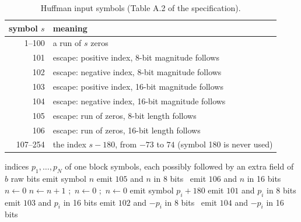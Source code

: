 \begin{table}[ht]
  \centering\small
  \begin{tabular}{@{}rl@{}}
    \toprule
    symbol $s$ & meaning\\
    \midrule
    1--100 & a run of $s$ zeros\\
    101 & escape: positive index, 8-bit magnitude follows\\
    102 & escape: negative index, 8-bit magnitude follows\\
    103 & escape: positive index, 16-bit magnitude follows\\
    104 & escape: negative index, 16-bit magnitude follows\\
    105 & escape: run of zeros, 8-bit length follows\\
    106 & escape: run of zeros, 16-bit length follows\\
    107--254 & the index $s - 180$, from $-73$ to $74$ (symbol 180 is never used)\\
    \bottomrule
  \end{tabular}
  \caption{Huffman input symbols (Table A.2 of the specification).}
  \label{tab:symbols}
\end{table}

\begin{algorithm}[ht]
  \caption{Turning a block of indices into symbols (as in the NIST encoder).}
  \label{alg:tokenize}
  \begin{algorithmic}[1]
    \Require indices $p_1, \dots, p_N$ of one block
    \Ensure symbols, each possibly followed by an extra field of $b$ raw bits
       emit symbol $n$
       emit $105$ and $n$ in 8 bits
      \Else\ emit $106$ and $n$ in 16 bits
      \EndIf
    \EndProcedure
    \State $n \gets 0$
        \State $n \gets n + 1$
         ;\ $n \gets 0$ \EndIf
      \Else
         ;\ $n \gets 0$ \EndIf
         emit symbol $p_i + 180$
         emit $101$ and $p_i$ in 8 bits
         emit $103$ and $p_i$ in 16 bits
         emit $102$ and $-p_i$ in 8 bits
        \Else\ emit $104$ and $-p_i$ in 16 bits
        \EndIf
      \EndIf
    \EndFor
      \EndIf
  \end{algorithmic}
\end{algorithm}

